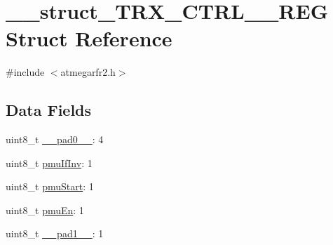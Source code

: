 \hypertarget{struct____struct___t_r_x___c_t_r_l__0___r_e_g}{\section{\-\_\-\-\_\-struct\-\_\-\-T\-R\-X\-\_\-\-C\-T\-R\-L\-\_\-\_\-\-R\-E\-G Struct Reference}
\label{struct____struct___t_r_x___c_t_r_l__0___r_e_g}
}


{\ttfamily \#include $<$atmegarfr2.\-h$>$}

\subsection*{Data Fields}
\begin{DoxyCompactItemize}
\item 
uint8\-\_\-t \hyperlink{struct____struct___t_r_x___c_t_r_l__0___r_e_g_a7eaef74d8b58b9cddc017d138fcb1b7d}{\-\_\-\-\_\-pad0\-\_\-\-\_\-}\-: 4
\item 
uint8\-\_\-t \hyperlink{struct____struct___t_r_x___c_t_r_l__0___r_e_g_a72377ce08eac29c87a57c1cced0f34d1}{pmu\-If\-Inv}\-: 1
\item 
uint8\-\_\-t \hyperlink{struct____struct___t_r_x___c_t_r_l__0___r_e_g_a60912b6d06dd8d49433dd44b34c24196}{pmu\-Start}\-: 1
\item 
uint8\-\_\-t \hyperlink{struct____struct___t_r_x___c_t_r_l__0___r_e_g_a4576f040a64a00890b3c5e90707dfeed}{pmu\-En}\-: 1
\item 
uint8\-\_\-t \hyperlink{struct____struct___t_r_x___c_t_r_l__0___r_e_g_a6c28e978162160507da5241c92109913}{\-\_\-\-\_\-pad1\-\_\-\-\_\-}\-: 1
\end{DoxyCompactItemize}


